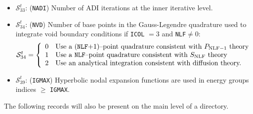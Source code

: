 \begin{itemize}
\item $\mathcal{S}^{t}_{33}$: ({\tt NADI}) Number of ADI iterations at the inner
iterative level.

\item $\mathcal{S}^{t}_{34}$: ({\tt NVD}) Number of base points in the Gauss-Legendre quadrature used to integrate
void boundary conditions if {\tt ICOL} $=3$ and {\tt NLF}$\ne 0$:
\begin{displaymath}
\mathcal{S}^{t}_{34} = \left\{
\begin{array}{rl}
 0 & \textrm{Use a ({\tt NLF}$+1$)--point quadrature consistent with $P_{{\rm NLF}-1}$ theory} \\
 1 & \textrm{Use a {\tt NLF}--point quadrature consistent with $S_{\rm NLF}$ theory} \\
 2 & \textrm{Use an analytical integration consistent with diffusion theory.}
\end{array} \right.
\end{displaymath}

\item $\mathcal{S}^{t}_{39}$: ({\tt IGMAX}) Hyperbolic nodal expansion functions are used in energy groups indices $\ge$ {\tt IGMAX}.

\end{itemize}

The following records will also be present on the main level of a 
directory.

